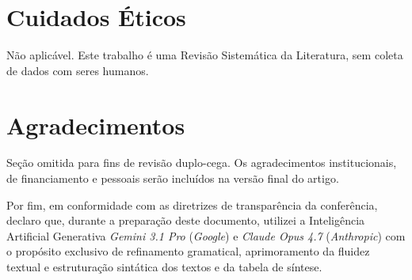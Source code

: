 \documentclass[12pt]{article}
\begin{document}
    \section*{Cuidados Éticos}

    Não aplicável. Este trabalho é uma Revisão Sistemática da Literatura, sem coleta de dados com seres humanos.

    \section*{Agradecimentos}

    Seção omitida para fins de revisão duplo-cega. Os agradecimentos institucionais, de financiamento e pessoais serão incluídos na versão final do artigo.

    Por fim, em conformidade com as diretrizes de transparência da conferência, declaro que, durante a preparação deste documento, utilizei a Inteligência Artificial Generativa \textit{Gemini 3.1 Pro} (\textit{Google}) e \textit{Claude Opus 4.7} (\textit{Anthropic}) com o propósito exclusivo de refinamento gramatical, aprimoramento da fluidez textual e estruturação sintática dos textos e da tabela de síntese. %




\end{document}
